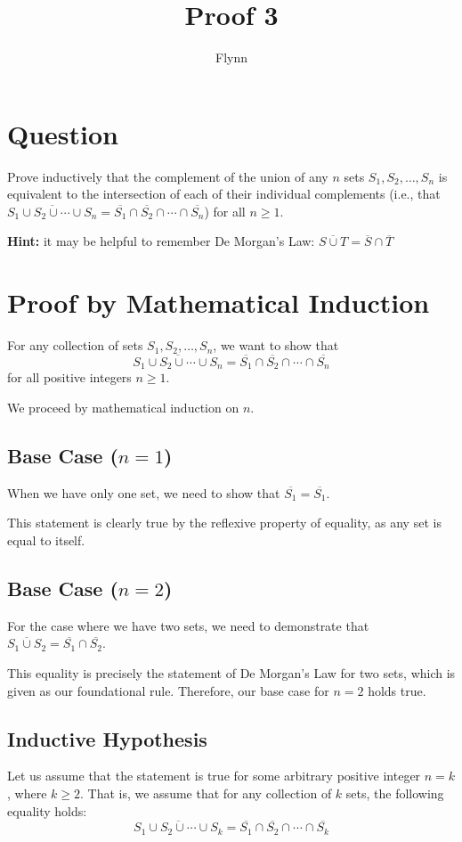 \documentclass{article}
\title{Proof 3}
\author{Flynn}
\date{}
\begin{document}
\maketitle

\section{Question}
Prove inductively that the complement of the union of any $n$ sets $S_1, S_2, \ldots, S_n$ is equivalent to the intersection of each of their individual complements (i.e., that $\overline{S_1 \cup S_2 \cup \cdots \cup S_n} = \overline{S_1} \cap \overline{S_2} \cap \cdots \cap \overline{S_n}$) for all $n \geq 1$.

\textbf{Hint:} it may be helpful to remember De Morgan's Law: $\overline{S \cup T} = \overline{S} \cap \overline{T}$

\section{Proof by Mathematical Induction}

For any collection of sets $S_1, S_2, \ldots, S_n$, we want to show that 
$$\overline{S_1 \cup S_2 \cup \cdots \cup S_n} = \overline{S_1} \cap \overline{S_2} \cap \cdots \cap \overline{S_n}$$
for all positive integers $n \geq 1$.

We proceed by mathematical induction on $n$.

\subsection{Base Case ($n = 1$)}
When we have only one set, we need to show that $\overline{S_1} = \overline{S_1}$.

This statement is clearly true by the reflexive property of equality, as any set is equal to itself.

\subsection{Base Case ($n = 2$)}
For the case where we have two sets, we need to demonstrate that $\overline{S_1 \cup S_2} = \overline{S_1} \cap \overline{S_2}$.

This equality is precisely the statement of De Morgan's Law for two sets, which is given as our foundational rule. Therefore, our base case for $n = 2$ holds true.

\subsection{Inductive Hypothesis}
Let us assume that the statement is true for some arbitrary positive integer $n = k$, where $k \geq 2$. That is, we assume that for any collection of $k$ sets, the following equality holds:
$$\overline{S_1 \cup S_2 \cup \cdots \cup S_k} = \overline{S_1} \cap \overline{S_2} \cap \cdots \cap \overline{S_k}$$
\end{document}
